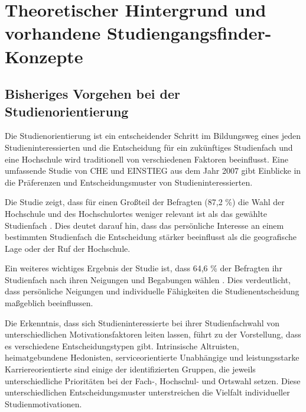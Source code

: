 \section{Theoretischer Hintergrund und vorhandene Studiengangsfinder-Konzepte}
\subsection{Bisheriges Vorgehen bei der Studienorientierung}


Die Studienorientierung ist ein entscheidender Schritt im Bildungsweg eines
jeden Studieninteressierten und die Entscheidung für ein zukünftiges Studienfach
und eine Hochschule wird traditionell von verschiedenen Faktoren beeinflusst.
Eine umfassende Studie von CHE und EINSTIEG aus dem Jahr 2007 gibt Einblicke in
die Präferenzen und Entscheidungsmuster von Studieninteressierten.

Die Studie zeigt, dass für einen Großteil der Befragten (87,2 \%) die Wahl der
Hochschule und des Hochschulortes weniger relevant ist als das gewählte
Studienfach \parencite{einflussfaktoren}. Dies deutet darauf hin, dass das
persönliche Interesse an einem bestimmten Studienfach die Entscheidung stärker
beeinflusst als die geografische Lage oder der Ruf der Hochschule.

Ein weiteres wichtiges Ergebnis der Studie ist, dass 64,6 \% der Befragten ihr
Studienfach nach ihren Neigungen und Begabungen wählen
\parencite{einflussfaktoren}. Dies verdeutlicht, dass persönliche Neigungen und
individuelle Fähigkeiten die Studienentscheidung maßgeblich beeinflussen.

Die Erkenntnis, dass sich Studieninteressierte bei ihrer Studienfachwahl von
unterschiedlichen Motivationsfaktoren leiten lassen, führt zu der Vorstellung,
dass es verschiedene Entscheidungstypen gibt. Intrinsische Altruisten,
heimatgebundene Hedonisten, serviceorientierte Unabhängige und leistungsstarke
Karriereorientierte sind einige der identifizierten Gruppen, die jeweils
unterschiedliche Prioritäten bei der Fach-, Hochschul- und Ortswahl setzen.
Diese unterschiedlichen Entscheidungsmuster unterstreichen die Vielfalt
individueller Studienmotivationen. \parencite{einflussfaktoren}

